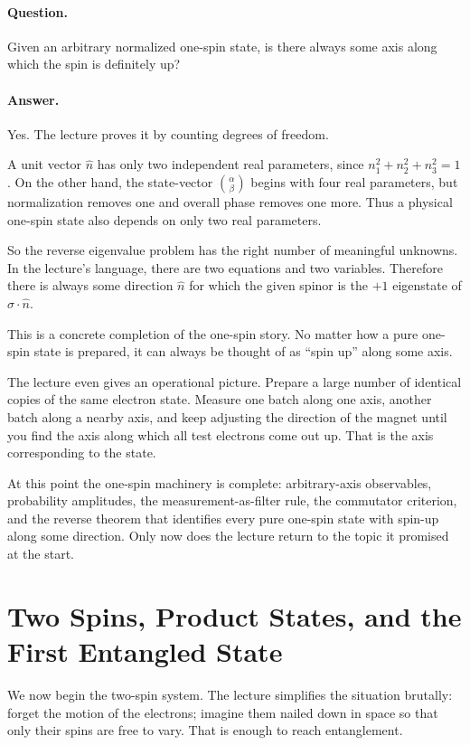 \paragraph{Question.} Given an arbitrary normalized one-spin state, is there always some axis along which the spin is definitely up?

\paragraph{Answer.} Yes. The lecture proves it by counting degrees of freedom.

A unit vector \(\hat n\) has only two independent real parameters, since \(n_1^2+n_2^2+n_3^2=1\). On the other hand, the state-vector \(\binom{\alpha}{\beta}\) begins with four real parameters, but normalization removes one and overall phase removes one more. Thus a physical one-spin state also depends on only two real parameters.

So the reverse eigenvalue problem has the right number of meaningful unknowns. In the lecture's language, there are two equations and two variables. Therefore there is always some direction \(\hat n\) for which the given spinor is the \(+1\) eigenstate of \(\sigma\cdot\hat n\).

This is a concrete completion of the one-spin story. No matter how a pure one-spin state is prepared, it can always be thought of as ``spin up'' along some axis.

The lecture even gives an operational picture. Prepare a large number of identical copies of the same electron state. Measure one batch along one axis, another batch along a nearby axis, and keep adjusting the direction of the magnet until you find the axis along which all test electrons come out up. That is the axis corresponding to the state.

At this point the one-spin machinery is complete: arbitrary-axis observables, probability amplitudes, the measurement-as-filter rule, the commutator criterion, and the reverse theorem that identifies every pure one-spin state with spin-up along some direction. Only now does the lecture return to the topic it promised at the start.

\section{Two Spins, Product States, and the First Entangled State}

We now begin the two-spin system. The lecture simplifies the situation brutally: forget the motion of the electrons; imagine them nailed down in space so that only their spins are free to vary. That is enough to reach entanglement.

